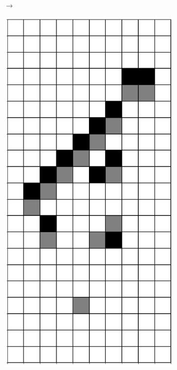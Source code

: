 \documentclass[12pt]{article}
\numberwithin{figure}{section} %
\begin{document}
\begin{figure}[H]
\begin{subfigure}{0.3\textwidth}
     		\subcaption{}
   	\end{subfigure}
	\begin{subfigure}[t]{0.03\textwidth}
		{\LARGE$\xrightarrow{}$}
  	\end{subfigure}	
      	\newline
	\begin{subfigure}[t]{0.03\textwidth}
		\phantom{B}
  	\end{subfigure}	
   	\begin{subfigure}{0.3\textwidth}
     		\centering
     		\includegraphics[angle=270,width=\linewidth]{Section4/23.6}

\end{subfigure}
\end{figure}
\end{document}
